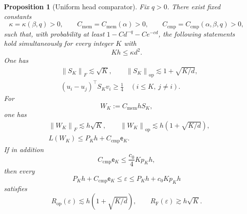 \documentclass[11pt]{article}
\newtheorem{proposition}[proposition]{Proposition}
\theoremstyle{definition}
\newcommand{\normF}[1]{\left\lVert #1\right\rVert_F}
\newcommand{\normop}[1]{\left\lVert #1\right\rVert_{\mathrm{op}}}
\newcommand{\RF}{R_{\mathrm F}}
\newcommand{\Rop}{R_{\mathrm{op}}}
\newcommand{\eps}{\varepsilon}
\begin{document}
\begin{proposition}[Uniform head comparator]
\label{prop:head-comparator}
Fix $q>0$.  There exist fixed constants
\[
 \kappa=\kappa(\beta,q)>0,
 \qquad C_{\mathrm{mem}}=C_{\mathrm{mem}}(\alpha)>0,
 \qquad C_{\mathrm{cmp}}=C_{\mathrm{cmp}}(\alpha,\beta,q)>0,
\]
such that, with probability at least $1-Cd^{-q}-Ce^{-cd}$, the
following statements hold simultaneously for every integer $K$ with
\begin{equation}
 Kh\leq\kappa d^2.
 \label{eq:head-size}
\end{equation}
One has
\begin{align}
 &\normF{S_K}\lesssim\sqrt K,
 \qquad
 \normop{S_K}\lesssim1+\sqrt{K/d},
 \label{eq:SK-norms}\\
 &(u_i-u_j)^\top S_Kv_i\geq\frac14
 \quad(i\leq K,\ j\neq i).
 \label{eq:head-margin}
\end{align}
For
\begin{equation}
 W_K:=C_{\mathrm{mem}}hS_K,
 \label{eq:WK-def}
\end{equation}
one has
\begin{align}
 &\normF{W_K}\lesssim h\sqrt K,
 \qquad
 \normop{W_K}\lesssim h(1+\sqrt{K/d}),
 \label{eq:WK-norms}\\
 &L(W_K)\leq P_Kh+C_{\mathrm{cmp}}\mathsf e_K.
 \label{eq:WK-loss}
\end{align}
If in addition
\begin{equation}
 C_{\mathrm{cmp}}\mathsf e_K
 \leq\frac{c_0}{4}Kp_Kh,
 \label{eq:head-admissible}
\end{equation}
then every
\begin{equation}
 P_Kh+C_{\mathrm{cmp}}\mathsf e_K
 \leq\eps\leq P_Kh+c_0Kp_Kh
 \label{eq:one-head-window}
\end{equation}
satisfies
\begin{equation}
 \Rop(\eps)\lesssim h(1+\sqrt{K/d}),
 \qquad
 \RF(\eps)\gtrsim h\sqrt K.
 \label{eq:one-head-radii}
\end{equation}
\end{proposition}
\end{document}

